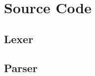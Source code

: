 \chapter{Source Code}\label{ch:sourcecode}

\section{Lexer}\label{sec:lexer}
%


\section{Parser}\label{sec:parser}
%
